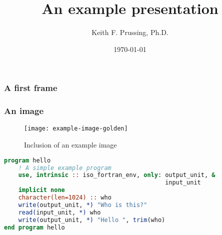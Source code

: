 \documentclass[aspectratio=169]{beamer}
\title{An example presentation}
\author{Keith F. Prussing, Ph.D.}
\date{\today}
\begin{document}
\begin{frame}
    \maketitle
\end{frame}

\begin{frame}
    \frametitle{A first frame}
    \blindtext
\end{frame}

\begin{frame}
    \frametitle{An image}
    \begin{figure}
        \texttt{[image: example-image-golden]}
        \caption{Inclusion of an example image}
    \end{figure}
\end{frame}

\begin{frame}[fragile]
    \begin{lstlisting}[language=Fortran]
program hello
    ! A simple example program
    use, intrinsic :: iso_fortran_env, only: output_unit, &
                                             input_unit
    implicit none
    character(len=1024) :: who
    write(output_unit, *) "Who is this?"
    read(input_unit, *) who
    write(output_unit, *) "Hello ", trim(who)
end program hello
    \end{lstlisting}
\end{frame}
\end{document}
